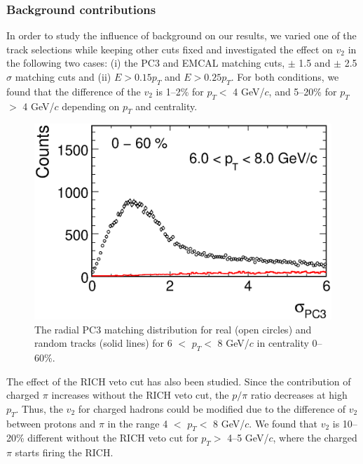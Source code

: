 \documentclass[aps,prc,superscriptaddress,showpacs,floatfix,twocolumn]{revtex4}
\newcommand \gevc{GeV/$c$\xspace}
\newcommand \pt{\mbox{$p_T$}\xspace}
\begin{document}
\subsubsection{Background contributions}

In order to study the influence of background on our results, we varied one of the track 
selections while keeping other cuts fixed and investigated the effect on $v_2$ in the following
two cases:
(i) the PC3 and EMCAL matching cuts, $\pm$ 1.5 and $\pm$ 2.5$\sigma$ matching cuts and
(ii) $E > 0.15 \pt$ and $E > 0.25 \pt$.
For both conditions, we found that the difference of the $v_2$ is 1--2\% for \pt $<$ 4 \gevc,
and 5--20\% for \pt $>$ 4 \gevc depending on \pt and centrality.

\begin{figure}[t]
\includegraphics[width=1.0\linewidth]{pc3matching_real_and_random.eps}
\caption{\label{fig:pc3matching_real_and_random}
The radial PC3 matching distribution for real (open circles) and random tracks (solid lines)
for 6 $<$ \pt $<$ 8 \gevc in centrality 0--60\%.
}
\end{figure}

The effect of the RICH veto cut has also been studied. Since the 
contribution of charged $\pi$ increases without the RICH veto 
cut, the $p/\pi$ ratio decreases at high \pt. Thus, the $v_2$ 
for charged hadrons could be modified due to the difference of 
$v_2$ between protons and $\pi$ in the range 4 $<$ \pt $<$ 8 
\gevc. We found that $v_2$ is 10--20\% different without the 
RICH veto cut for \pt $>$ 4--5 \gevc, where the charged $\pi$ starts 
firing the RICH.
\end{document}
